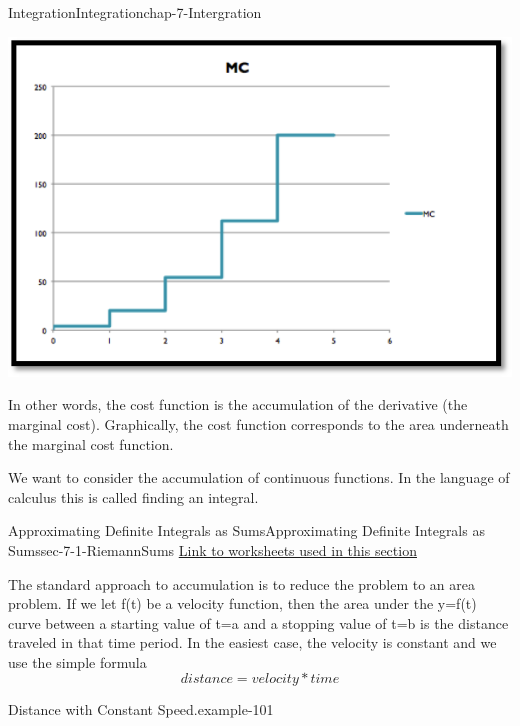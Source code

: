 \documentclass[oneside,10pt,]{book}
\numberwithin{equation}{section}
\begin{document}
\begin{chapterptx}{Integration}{}{Integration}{}{}{chap-7-Intergration}
\begin{introduction}{}
\begin{sidebyside}{1}{0.2}{0.2}{0}
\begin{sbspanel}{0.6}
\includegraphics[width=1\linewidth]{images/sec7-0-2.png}
\end{sbspanel}%
\end{sidebyside}%
\par
\hypertarget{p-2541}{}%
In other words, the cost function is the accumulation of the derivative (the marginal cost). Graphically, the cost function corresponds to the area underneath the marginal cost function.%
\par
\hypertarget{p-2542}{}%
We want to consider the accumulation of continuous functions.  In the language of calculus this is called finding an integral.%
\end{introduction}%
%
%
\typeout{************************************************}
\typeout{************************************************}
%
\begin{sectionptx}{Approximating Definite Integrals as Sums}{}{Approximating Definite Integrals as Sums}{}{}{sec-7-1-RiemannSums}
\hypertarget{p-2543}{}%
\href{./Examples/Section-7-1-Examples.xlsx}{Link to worksheets used in this section}%
\par
\hypertarget{p-2544}{}%
The standard approach to accumulation is to reduce the problem to an area problem.  If we let f(t) be a velocity function, then the area under the y=f(t) curve between a starting value of t=a and a stopping value of t=b is the distance traveled in that time period.  In the easiest case, the velocity is constant and we use the simple formula%
%
\begin{equation*}
distance = velocity * time 
\end{equation*}
\begin{example}{Distance with Constant Speed.}{example-101}%

\end{example}
\end{sectionptx}
\end{chapterptx}
\end{document}
